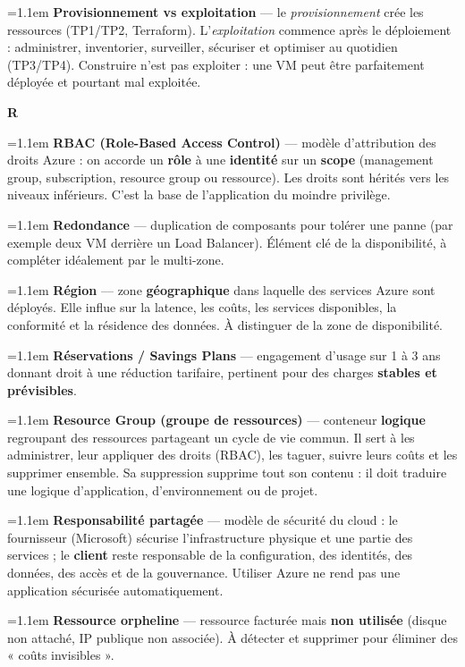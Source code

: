\documentclass[11pt,a4paper]{article}
\newcommand{\lettre}[1]{%
  \par\addvspace{9pt}\needspace{4.5\baselineskip}%
  \markright{#1}%
  {\noindent\sffamily\bfseries\Large\color{azure}#1}%
  \nobreak\vspace{0.4mm}{\color{azure!45}\hrule height 1pt}\nobreak\vspace{3mm}\par}
\newcommand{\df}[2]{%
  \par\addvspace{4pt}\needspace{2\baselineskip}%
  \hangindent=1.1em\hangafter=1
  {\sffamily\bfseries\color{azuredark}#1} — #2\par}
\begin{document}
\df{Provisionnement vs exploitation}{le \emph{provisionnement} crée les ressources (TP1/TP2, Terraform). L'\emph{exploitation} commence après le déploiement : administrer, inventorier, surveiller, sécuriser et optimiser au quotidien (TP3/TP4). Construire n'est pas exploiter : une VM peut être parfaitement déployée et pourtant mal exploitée.}

\lettre{R}

\df{RBAC (Role-Based Access Control)}{modèle d'attribution des droits Azure : on accorde un \textbf{rôle} à une \textbf{identité} sur un \textbf{scope} (management group, subscription, resource group ou ressource). Les droits sont hérités vers les niveaux inférieurs. C'est la base de l'application du moindre privilège.}

\df{Redondance}{duplication de composants pour tolérer une panne (par exemple deux VM derrière un Load Balancer). Élément clé de la disponibilité, à compléter idéalement par le multi-zone.}

\df{Région}{zone \textbf{géographique} dans laquelle des services Azure sont déployés. Elle influe sur la latence, les coûts, les services disponibles, la conformité et la résidence des données. À distinguer de la zone de disponibilité.}

\df{Réservations / Savings Plans}{engagement d'usage sur 1 à 3 ans donnant droit à une réduction tarifaire, pertinent pour des charges \textbf{stables et prévisibles}.}

\df{Resource Group (groupe de ressources)}{conteneur \textbf{logique} regroupant des ressources partageant un cycle de vie commun. Il sert à les administrer, leur appliquer des droits (RBAC), les taguer, suivre leurs coûts et les supprimer ensemble. Sa suppression supprime tout son contenu : il doit traduire une logique d'application, d'environnement ou de projet.}

\df{Responsabilité partagée}{modèle de sécurité du cloud : le fournisseur (Microsoft) sécurise l'infrastructure physique et une partie des services ; le \textbf{client} reste responsable de la configuration, des identités, des données, des accès et de la gouvernance. Utiliser Azure ne rend pas une application sécurisée automatiquement.}

\df{Ressource orpheline}{ressource facturée mais \textbf{non utilisée} (disque non attaché, IP publique non associée). À détecter et supprimer pour éliminer des « coûts invisibles ».}
\end{document}
